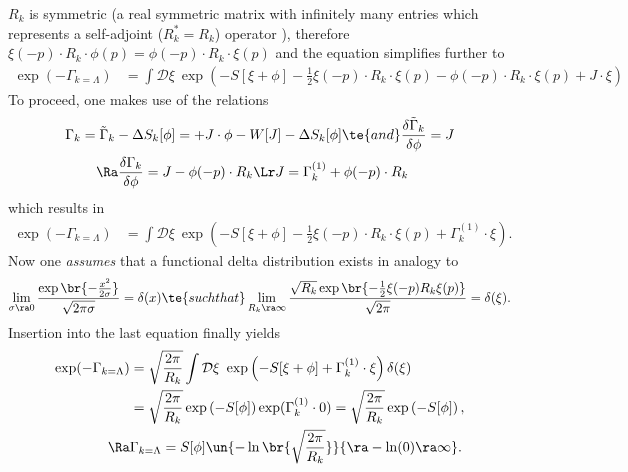 \( R_k \) is symmetric (a real symmetric matrix with infinitely many entries which represents a self-adjoint (\( R^*_k = R_k \)) operator ), therefore \( \xi(-p) \cdot R_k  \cdot \phi(p) =  \phi(-p) \cdot R_k  \cdot \xi(p) \) and the equation simplifies further to
\begin{equation*}
\begin{split}
\exp(-\Gamma_{k=\Lambda}) &= \int \mathcal{D}\xi ~\exp\left( -S[\xi+\phi] - \frac{1}{2} \xi(-p)\cdot R_k\cdot \xi(p) -  \phi(-p)\cdot R_k\cdot \xi(p) + J\cdot \xi \right)
\end{split}
\end{equation*}
To proceed, one makes use of the relations
\begin{equation*}
\begin{split}
\Gamma_k = \tilde \Gamma_k - \Delta&S_k[\phi]= +  J\cdot \phi - W[J] - \Delta S_k[\phi]
\te{ and }  \frac{\delta \tilde \Gamma_k}{\delta \phi} = J \\
\Ra  \frac{\delta \Gamma_k}{\delta \phi}
&= J -   \phi(-p) \cdot R_k %
\Lr J = \Gamma_k^{(1)} +   \phi(-p) \cdot R_k
\end{split}
\end{equation*}
which results in
\begin{equation*}
\begin{split}
\exp(-\Gamma_{k=\Lambda}) &= \int \mathcal{D}\xi ~\exp\left( -S[\xi+\phi] - \frac{1}{2} \xi(-p)\cdot R_k\cdot \xi(p)  + \Gamma_k^{(1)} \cdot \xi \right).
\end{split}
\end{equation*}
Now one \emph{assumes} that a functional delta distribution exists in analogy to
\begin{equation*}
\begin{split}
\lim_{ \sigma \ra 0} \frac{\exp\br{- \frac{x^2}{2\sigma}} }{\sqrt{2\pi \sigma}} = \delta(x) \te{ such that } \lim_{ R_k \ra \infty} \frac{ \sqrt{R_k} \exp\br{-\frac{1}{2} \xi(-p) R_k \xi(p) } }{\sqrt{2 \pi}} = \delta(\xi).
\end{split}
\end{equation*}
Insertion into the last equation finally yields
\begin{equation*}
\begin{split}
\exp(-\Gamma_{k=\Lambda}) &= \sqrt{ \frac{2\pi}{R_k}} \int \mathcal{D}\xi ~\exp\left( -S[\xi+\phi] + \Gamma_k^{(1)} \cdot \xi \right) \delta(\xi) \\
&= \sqrt{ \frac{2\pi}{R_k}} \exp\left( -S[\phi] \right) \exp( \Gamma_k^{(1)} \cdot 0 )= \sqrt{ \frac{2\pi}{R_k}} \exp\left( -S[\phi] \right), \\
\Ra & \Gamma_{k=\Lambda} = S[\phi] \un{- \ln\br{ \sqrt{ \frac{2\pi}{R_k} }}}{\ra -\ln(0) \ra \infty }.
\end{split}
\end{equation*}
